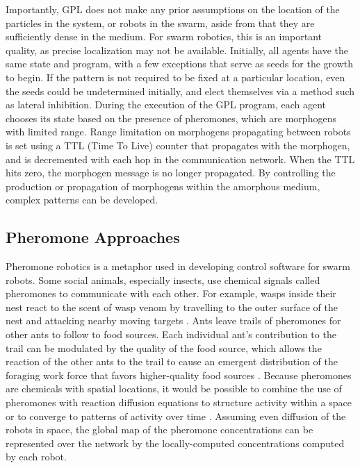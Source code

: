 Importantly, GPL does not make any prior assumptions on the location of the particles in the system, or robots in the swarm, aside from that they are sufficiently dense in the medium. 
For swarm robotics, this is an important quality, as precise localization may not be available. 
Initially, all agents have the same state and program, with a few exceptions that serve as seeds for the growth to begin. 
If the pattern is not required to be fixed at a particular location, even the seeds could be undetermined initially, and elect themselves via a method such as lateral inhibition. 
During the execution of the GPL program, each agent chooses its state based on the presence of pheromones, which are morphogens with limited range. 
Range limitation on morphogens propagating between robots is set using a TTL (Time To Live) counter that propagates with the morphogen, and is decremented with each hop in the communication network. 
When the TTL hits zero, the morphogen message is no longer propagated. 
By controlling the production or propagation of morphogens within the amorphous medium, complex patterns can be developed. 

\subsection{Pheromone Approaches} \label{section:Pheromone_Approaches}

Pheromone robotics is a metaphor used in developing control software for swarm robots. 
Some social animals, especially insects, use chemical signals called pheromones to communicate with each other. 
For example, wasps inside their nest react to the scent of wasp venom by travelling to the outer surface of the nest and attacking nearby moving targets  \citep{jeanne1981alarm}.
Ants leave trails of pheromones for other ants to follow to food sources. 
Each individual ant's contribution to the trail can be modulated by the quality of the food source, which allows the reaction of the other ants to the trail to cause an emergent distribution of the foraging work force that favors higher-quality food sources \citep{sumpter2003nonlinearity}.
Because pheromones are chemicals with spatial locations, it would be possible to combine the use of pheromones with reaction diffusion equations to structure activity within a space or to converge to patterns of activity over time  \citep{turing1952chemical}. 
Assuming even diffusion of the robots in space, the global map of the pheromone concentrations can be represented over the network by the locally-computed concentrations computed by each robot.

